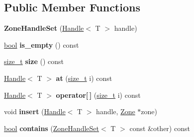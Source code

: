 \subsection*{Public Member Functions}
\begin{DoxyCompactItemize}
\item 
\mbox{\label{classv8_1_1internal_1_1ZoneHandleSet_aad55700cc17a968d985161aefc370dad}} 
{\bfseries Zone\+Handle\+Set} (\mbox{\hyperlink{classv8_1_1internal_1_1Handle}{Handle}}$<$ T $>$ handle)
\item 
\mbox{\label{classv8_1_1internal_1_1ZoneHandleSet_a5c106eceacbf37b080b7ee1e9ade442b}} 
\mbox{\hyperlink{classbool}{bool}} {\bfseries is\+\_\+empty} () const
\item 
\mbox{\label{classv8_1_1internal_1_1ZoneHandleSet_a430657c89d567dba81c2f7f6a76b11f2}} 
\mbox{\hyperlink{classsize__t}{size\+\_\+t}} {\bfseries size} () const
\item 
\mbox{\label{classv8_1_1internal_1_1ZoneHandleSet_a2b98727054737b4521516192a1302f8a}} 
\mbox{\hyperlink{classv8_1_1internal_1_1Handle}{Handle}}$<$ T $>$ {\bfseries at} (\mbox{\hyperlink{classsize__t}{size\+\_\+t}} i) const
\item 
\mbox{\label{classv8_1_1internal_1_1ZoneHandleSet_a2593cca9f7e8d966924d5903b53526cf}} 
\mbox{\hyperlink{classv8_1_1internal_1_1Handle}{Handle}}$<$ T $>$ {\bfseries operator\mbox{[}$\,$\mbox{]}} (\mbox{\hyperlink{classsize__t}{size\+\_\+t}} i) const
\item 
\mbox{\label{classv8_1_1internal_1_1ZoneHandleSet_a07c8b4c4d5841ac21ba70d7eb6bf432b}} 
void {\bfseries insert} (\mbox{\hyperlink{classv8_1_1internal_1_1Handle}{Handle}}$<$ T $>$ handle, \mbox{\hyperlink{classv8_1_1internal_1_1Zone}{Zone}} $\ast$zone)
\item 
\mbox{\label{classv8_1_1internal_1_1ZoneHandleSet_a801c591f64d72e34e9da329ab3ab41ba}} 
\mbox{\hyperlink{classbool}{bool}} {\bfseries contains} (\mbox{\hyperlink{classv8_1_1internal_1_1ZoneHandleSet}{Zone\+Handle\+Set}}$<$ T $>$ const \&other) const

\end{DoxyCompactItemize}
